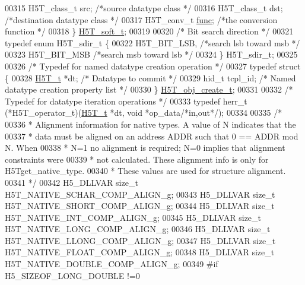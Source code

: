\begin{DoxyCode}
00315     H5T\_class\_t src;            \textcolor{comment}{/*source datatype class      */}
00316     H5T\_class\_t dst;            \textcolor{comment}{/*destination datatype class         */}
00317     H5T\_conv\_t  \hyperlink{structfunc}{func};           \textcolor{comment}{/*the conversion function        */}
00318 \} \hyperlink{struct_h5_t__soft__t}{H5T\_soft\_t};
00319 
00320 \textcolor{comment}{/* Bit search direction */}
00321 \textcolor{keyword}{typedef} \textcolor{keyword}{enum} H5T\_sdir\_t \{
00322     H5T\_BIT\_LSB,            \textcolor{comment}{/*search lsb toward msb          */}
00323     H5T\_BIT\_MSB             \textcolor{comment}{/*search msb toward lsb          */}
00324 \} H5T\_sdir\_t;
00325 
00326 \textcolor{comment}{/* Typedef for named datatype creation operation */}
00327 \textcolor{keyword}{typedef} \textcolor{keyword}{struct }\{
00328     \hyperlink{struct_h5_t__t}{H5T\_t} *dt;                  \textcolor{comment}{/* Datatype to commit */}
00329     hid\_t tcpl\_id;              \textcolor{comment}{/* Named datatype creation property list */}
00330 \} \hyperlink{struct_h5_t__obj__create__t}{H5T\_obj\_create\_t};
00331 
00332 \textcolor{comment}{/* Typedef for datatype iteration operations */}
00333 \textcolor{keyword}{typedef} herr\_t (*H5T\_operator\_t)(\hyperlink{struct_h5_t__t}{H5T\_t} *dt, \textcolor{keywordtype}{void} *op\_data\textcolor{comment}{/*in,out*/});
00334 
00335 \textcolor{comment}{/*}
00336 \textcolor{comment}{ * Alignment information for native types. A value of N indicates that the}
00337 \textcolor{comment}{ * data must be aligned on an address ADDR such that 0 == ADDR mod N. When}
00338 \textcolor{comment}{ * N=1 no alignment is required; N=0 implies that alignment constraints were}
00339 \textcolor{comment}{ * not calculated.  These alignment info is only for H5Tget\_native\_type.}
00340 \textcolor{comment}{ * These values are used for structure alignment.}
00341 \textcolor{comment}{ */}
00342 H5\_DLLVAR \textcolor{keywordtype}{size\_t}    H5T\_NATIVE\_SCHAR\_COMP\_ALIGN\_g;
00343 H5\_DLLVAR \textcolor{keywordtype}{size\_t}    H5T\_NATIVE\_SHORT\_COMP\_ALIGN\_g;
00344 H5\_DLLVAR \textcolor{keywordtype}{size\_t}    H5T\_NATIVE\_INT\_COMP\_ALIGN\_g;
00345 H5\_DLLVAR \textcolor{keywordtype}{size\_t}    H5T\_NATIVE\_LONG\_COMP\_ALIGN\_g;
00346 H5\_DLLVAR \textcolor{keywordtype}{size\_t}    H5T\_NATIVE\_LLONG\_COMP\_ALIGN\_g;
00347 H5\_DLLVAR \textcolor{keywordtype}{size\_t}    H5T\_NATIVE\_FLOAT\_COMP\_ALIGN\_g;
00348 H5\_DLLVAR \textcolor{keywordtype}{size\_t}    H5T\_NATIVE\_DOUBLE\_COMP\_ALIGN\_g;
00349 \textcolor{preprocessor}{#if H5\_SIZEOF\_LONG\_DOUBLE !=0}

\end{DoxyCode}
